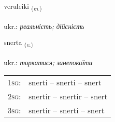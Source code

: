 \documentclass[frontgrid, backgrid]{flacards}\usepackage[]{graphicx}\usepackage[]{xcolor}
\begin{document}
\renewcommand{\flhead}{\vskip5pt \fboxsep=0pt {\small\bfseries\footnotesize Nafnorð | іменник}}
\renewcommand{\fcfoot}{\vskip5pt \fboxsep=0pt \hspace{2pt}{\small\bfseries\footnotesize 2K}}

\renewcommand{\blhead}{\vskip5pt {\small\bfseries\footnotesize Nafnorð | іменник }}
\renewcommand{\bcfoot}{\vskip5pt \hspace{2pt}{\small\bfseries\footnotesize 2K}}


{veruleiki \small{\textsubscript{(\textit{m.})}} \\[1ex] %
\textphonetic{[vɛːrʏleicɪ]} \\
ukr.: \emph{реальність; дійсність} \\  [2ex]
\renewcommand*{\arraystretch}{0.8}
}

\renewcommand{\flhead}{\vskip5pt \fboxsep=0pt {\small\bfseries\footnotesize Sagnorð | дієслово}}
\renewcommand{\fcfoot}{\vskip5pt \fboxsep=0pt \hspace{2pt}{\small\bfseries\footnotesize 2K}}

\renewcommand{\blhead}{\vskip5pt {\small\bfseries\footnotesize Sagnorð | дієслово }}
\renewcommand{\bcfoot}{\vskip5pt \hspace{2pt}{\small\bfseries\footnotesize 2K}}


{snerta \small{\textsubscript{(\textit{v.})}} \\[1ex] %
\textphonetic{[stnɛr̥ta]} \\
ukr.: \emph{торкатися; занепокоїти} \\  [2ex]
\renewcommand*{\arraystretch}{0.8}
\begin{tabular}{p{1cm}l}
\textsc{1sg}: & snerti -- snerti -- snert \\ 
\textsc{2sg}: & snertir -- snertir -- snert \\ 
\textsc{3sg}: & snertir -- snerti -- snert \\ 
\end{tabular}
}
\end{document}
